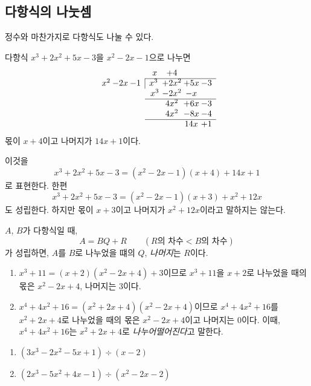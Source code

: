 \documentclass{oblivoir}
\begin{document}
\clearpage
\subsection{다항식의 나눗셈}

정수와 마찬가지로 다항식도 나눌 수 있다.

%
\exam{}
다항식 \(x^3+2x^2+5x-3\)을 \(x^2-2x-1\)으로 나누면
\begin{equation*}
\begin{array}{c@{\:}c@{\:}cc@{\:}c@{\:}c@{\:}c}
&&&x&+4\\
\cline{4-7}
x^2&-2x&-1	&\multicolumn{1}{|c}{x^3}&+2x^2&+5x&-3\\
&&							&x^3	&-2x^2	&-x\\
\cline{4-7}
&&							&			&4x^2	&+6x		&-3\\
&&							&			&4x^2	&-8x	&-4\\
\cline{4-7}
&&							&			&			&14x	&+1
\end{array}
\end{equation*}
몫이 \(x+4\)이고 나머지가 \(14x+1\)이다.

이것을
\[x^3+2x^2+5x-3=(x^2-2x-1)(x+4)+14x+1\]
로 표현한다.
한편
\[x^3+2x^2+5x-3=(x^2-2x-1)(x+3)+x^2+12x\]
도 성립한다.
하지만 몫이 \(x+3\)이고 나머지가 \(x^2+12x\)이라고 말하지는 않는다.

\begin{mdframed}
%
\(A\), \(B\)가 다항식일 때,
\[A=BQ+R\qquad(R\text{의 차수}<B\text{의 차수})\]
가 성립하면, \(A\)를 \(B\)로 나누었을 떄의  \(Q\), \emph{나머지}는 \(R\)이다.
\end{mdframed}

\clearpage
%
\exam{}
\begin{enumerate}[(1)]
\item
\(x^3+11=(x+2)(x^2-2x+4)+3\)이므로 \(x^3+11\)을 \(x+2\)로 나누었을 때의 몫은 \(x^2-2x+4\), 나머지는 \(3\)이다.
\item
\(x^4+4x^2+16=(x^2+2x+4)(x^2-2x+4)\)이므로 \(x^4+4x^2+16\)를 \(x^2+2x+4\)로 나누었을 때의 몫은 \(x^2-2x+4\)이고 나머지는 \(0\)이다.
이때, \(x^4+4x^2+16\)는 \(x^2+2x+4\)로 \emph{나누어떨어진다}고 말한다.
\end{enumerate}

%
\begin{enumerate}[(1)]\label{poly_div_prob}
\item
\((3x^3-2x^2-5x+1)\div(x-2)\)
\item
\((2x^3-5x^2+4x-1)\div(x^2-2x-2)\)
\end{enumerate}
\end{document}
